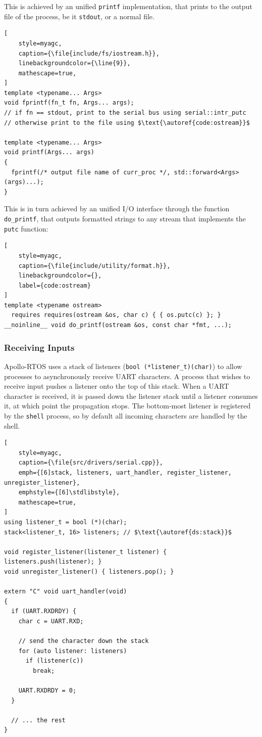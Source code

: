 This is achieved by an unified \lstinline[style=myagc]|printf| implementation, that
prints to the output file of the process, be it \lstinline[style=myagc]|stdout|, or a
normal file.
\begin{lstlisting}[
    style=myagc,
    caption={\file{include/fs/iostream.h}},
    linebackgroundcolor={\line{9}},
    mathescape=true,
]
template <typename... Args>
void fprintf(fn_t fn, Args... args);
// if fn == stdout, print to the serial bus using serial::intr_putc
// otherwise print to the file using $\text{\autoref{code:ostream}}$

template <typename... Args>
void printf(Args... args)
{
  fprintf(/* output file name of curr_proc */, std::forward<Args>(args)...);
}
\end{lstlisting}

This is in turn achieved by an unified I/O interface through the function
\lstinline[style=myagc]|do_printf|, that outputs formatted strings to any stream that
implements the \lstinline[style=myagc]|putc| function:

\begin{lstlisting}[
    style=myagc,
    caption={\file{include/utility/format.h}},
    linebackgroundcolor={},
    label={code:ostream}
]
template <typename ostream>
  requires requires(ostream &os, char c) { { os.putc(c) }; }
__noinline__ void do_printf(ostream &os, const char *fmt, ...);
\end{lstlisting}


\subsubsection{Receiving Inputs}

Apollo-RTOS uses a stack of listeners %
(\lstinline[style=myagc]|bool (*listener_t)(char)|) to allow processes to
asynchronously receive UART characters. A process that wishes to receive input pushes a
listener onto the top of this stack. When a UART character is received, it is passed
down the listener stack until a listener consumes it, at which point the propagation
stops. The bottom-most listener is registered by the \lstinline[style=myagc]|shell|
process, so by default all incoming characters are handled by the shell.

\begin{lstlisting}[
    style=myagc,
    caption={\file{src/drivers/serial.cpp}},
    emph={[6]stack, listeners, uart_handler, register_listener, unregister_listener},
    emphstyle={[6]\stdlibstyle},
    mathescape=true,
]
using listener_t = bool (*)(char);
stack<listener_t, 16> listeners; // $\text{\autoref{ds:stack}}$

void register_listener(listener_t listener) { listeners.push(listener); }
void unregister_listener() { listeners.pop(); }

extern "C" void uart_handler(void)
{
  if (UART.RXDRDY) {
    char c = UART.RXD;

    // send the character down the stack
    for (auto listener: listeners)
      if (listener(c))
        break;

    UART.RXDRDY = 0;
  }

  // ... the rest
}
\end{lstlisting}


